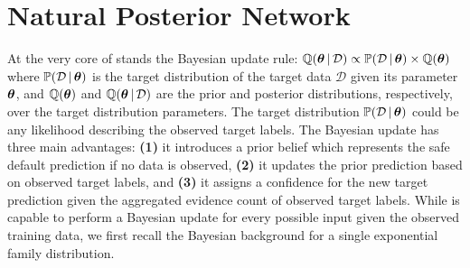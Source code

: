 \section{Natural Posterior Network}
\label{sec:model_007}

At the very core of \NatPNacro{} stands the Bayesian update rule: $    \operatorname{\mathbb{Q}}(\bm{\theta} \,|\, \mathcal{D}) \propto \operatorname{\mathbb{P}}(\mathcal{D} \,|\, \bm{\theta}) \times \operatorname{\mathbb{Q}}(\bm{\theta})$
%
%
where $\operatorname{\mathbb{P}}(\mathcal{D} \,|\, \bm{\theta})$ is the target distribution of the target data $\mathcal{D}$ given its parameter $\bm{\theta}$, and $\operatorname{\mathbb{Q}}(\bm{\theta} )$ and $\operatorname{\mathbb{Q}}(\bm{\theta} \,|\, \mathcal{D})$ are the prior and posterior distributions, respectively, over the target distribution parameters. The target distribution $\operatorname{\mathbb{P}}(\mathcal{D} \,|\, \bm{\theta})$ could be any likelihood describing the observed target labels. The Bayesian update has three main advantages: \textbf{(1)} it introduces a prior belief which represents the safe default prediction if no data is observed, \textbf{(2)} it updates the prior prediction based on observed target labels, and \textbf{(3)} it assigns a confidence for the new target prediction given the aggregated evidence count of observed target labels. While \NatPNacro{} is capable to perform a Bayesian update for every possible input given the observed training data, we first recall the Bayesian background for a single exponential family distribution.

